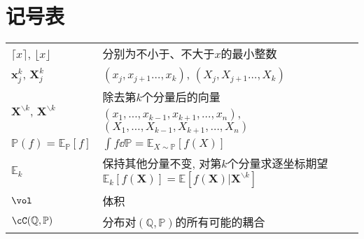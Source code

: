 \section*{记号表}

\noindent
\begin{tabular}{p{} p{}}
\hline
	$\lceil x \rceil$, $\lfloor x \rfloor$ & 分别为不小于、不大于$x$的最小整数 \\
	$\bm{x}_j^k$, $\bm{X}_j^k$ & $(x_j, x_{j+1} \dots, x_k)$, $(X_j, X_{j+1} \dots, X_k)$ \\
	$\bm{X}^{\backslash k}$, $\bm{X}^{\backslash k}$ & 除去第$k$个分量后的向量$(x_1, \dots, x_{k-1}, x_{k+1}, \dots, x_n)$, $(X_1, \dots, X_{k-1}, X_{k+1}, \dots, X_n)$ \\
	$\mathbb{P}(f) = \mathbb{E}_{\mathbb{P}}[f]$ & $\int f \dd \mathbb{P} = \mathbb{E}_{X \sim \mathbb{P}} [f(X)]$ \\
	$\mathbb{E}_k$ & 保持其他分量不变, 对第$k$个分量求逐坐标期望$\mathbb{E}_k[f(\bm{X})] = \mathbb{E}[f(\bm{X}) | \bm{X}^{\backslash k}]$ \\
	$\vol$ & 体积 \\
	$\cC(\mathbb{Q}, \mathbb{P})$ & 分布对$(\mathbb{Q}, \mathbb{P})$的所有可能的耦合 \\
\hline
\end{tabular}
